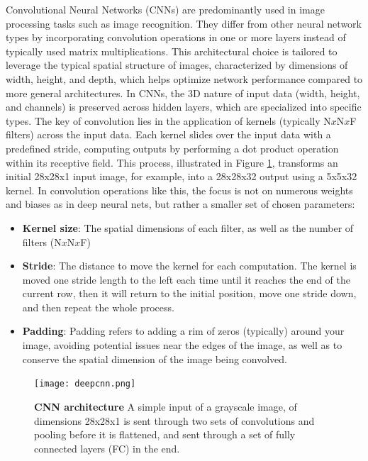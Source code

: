 Convolutional Neural Networks (CNNs) are predominantly used in image processing tasks such as image recognition. They differ from other neural network types by incorporating convolution operations in one or more layers instead of typically used matrix multiplications. This architectural choice is tailored to leverage the typical spatial structure of images, characterized by dimensions of width, height, and depth, which helps optimize network performance compared to more general architectures. In CNNs, the 3D nature of input data (width, height, and channels) is preserved across hidden layers, which are specialized into specific types. The key of convolution lies in the application of kernels (typically N$x$N$x$F filters) across the input data. Each kernel slides over the input data with a predefined stride, computing outputs by performing a dot product operation within its receptive field. This process, illustrated in Figure \ref{fig:cnn}, transforms an initial 28x28x1 input image, for example, into a 28x28x32 output using a 5x5x32 kernel. In convolution operations like this, the focus is not on numerous weights and biases as in deep neural nets, but rather a smaller set of chosen parameters: 


\begin{itemize}
 \item \textbf{Kernel size}: The spatial dimensions of each filter, as well as the number of filters (N$x$N$x$F)
 \item \textbf{Stride}: The distance to move the kernel for each computation. The kernel is moved one stride length to the left each time until it reaches the end of the current row, then it will return to the initial position, move one stride down, and then repeat the whole process.
 \item \textbf{Padding}: Padding refers to adding a rim of zeros (typically) around your image, avoiding potential issues near the edges of the image, as well as to conserve the spatial dimension of the image being convolved.
\end{itemize}

\begin{figure}[H]
 \centering
 \texttt{[image: deepcnn.png]}
 \caption{\textbf{CNN architecture} A simple input of a grayscale image, of dimensions 28x28x1 is sent through two sets of convolutions and pooling before it is flattened, and sent through a set of fully connected layers (FC) in  the end.}
 \label{fig:cnn}
\end{figure}

